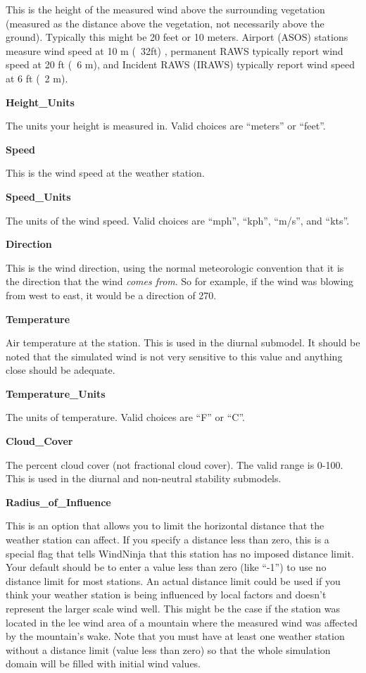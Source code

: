\documentclass[12pt]{article}
\begin{document}
This is the height of the measured wind above the surrounding vegetation (measured as the distance above the vegetation, not necessarily above the ground).  Typically this might be 20 feet or 10 meters. Airport (ASOS) stations measure wind speed at 10 m (~32ft) , permanent RAWS typically report wind speed at 20 ft (~6 m), and Incident RAWS (IRAWS) typically report wind speed at 6 ft (~2 m).

\textbf{Height\_Units}

The units your height is measured in.  Valid choices are “meters” or “feet”.

\textbf{Speed}

This is the wind speed at the weather station.

\textbf{Speed\_Units}

The units of the wind speed.  Valid choices are “mph”, “kph”, “m/s”, and “kts”.

\textbf{Direction}

This is the wind direction, using the normal meteorologic convention that it is the direction that the wind \textit{comes from}.  So for example, if the wind was blowing from west to east, it would be a direction of 270.

\textbf{Temperature}

Air temperature at the station.  This is used in the diurnal submodel.  It should be noted that the simulated wind is not very sensitive to this value and anything close should be adequate.

\textbf{Temperature\_Units}

The units of temperature.  Valid choices are “F” or “C”.

\textbf{Cloud\_Cover}

The percent cloud cover (not fractional cloud cover).  The valid range is 0-100.  This is used in the diurnal and non-neutral stability submodels.

\textbf{Radius\_of\_Influence}

This is an option that allows you to limit the horizontal distance that the weather station can affect.  If you specify a distance less than zero, this is a special flag that tells WindNinja that this station has no imposed distance limit.  Your default should be to enter a value less than zero (like “-1”) to use no distance limit for most stations.  An actual distance limit could be used if you think your weather station is being influenced by local factors and doesn't represent the larger scale wind well.  This might be the case if the station was located in the lee wind area of a mountain where the measured wind was affected by the mountain's wake.  Note that you must have at least one weather station without a distance limit (value less than zero) so that the whole simulation domain will be filled with initial wind values.
\end{document}
